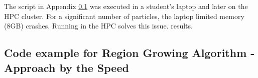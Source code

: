 \documentclass[12pt]{article}
\begin{document}
The script in Appendix \ref{App:App_speed_code} was executed in a student's
laptop and later on the HPC cluster. For a significant number of particles, the laptop limited memory (8GB) crashes. Running in the HPC solves this issue. results.


\subsection{Code example for Region Growing Algorithm - Approach by the Speed} \label{App:App_speed_code}
\tiny

\end{document}
